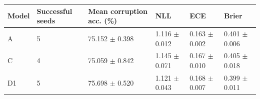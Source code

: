 \begin{tabular}{llllll}
\toprule
Model & Successful seeds & Mean corruption acc. (\%) & NLL & ECE & Brier \\
\midrule
A & 5 & 75.152 $\pm$ 0.398 & 1.116 $\pm$ 0.012 & 0.163 $\pm$ 0.002 & 0.401 $\pm$ 0.006 \\
C & 4 & 75.059 $\pm$ 0.842 & 1.145 $\pm$ 0.071 & 0.167 $\pm$ 0.010 & 0.405 $\pm$ 0.018 \\
D1 & 5 & 75.698 $\pm$ 0.520 & 1.121 $\pm$ 0.043 & 0.168 $\pm$ 0.007 & 0.399 $\pm$ 0.011 \\
\bottomrule
\end{tabular}
